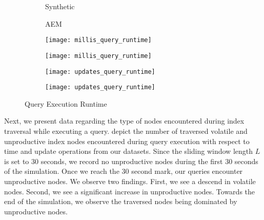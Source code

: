 \documentclass[abstracton,12pt]{scrartcl}
\theoremstyle{definition}
\begin{document}
\begin{figure}[h]
  \centering
  \begin{subfigure}{0.49\linewidth}
    \centering
    Synthetic
  \end{subfigure}
  \begin{subfigure}{0.49\linewidth}
    \centering
    AEM
  \end{subfigure}
  \begin{subfigure}{0.49\linewidth}
    \centering
    \texttt{[image: millis\_query\_runtime]}
    \caption{}
    \label{fig:query_runtime_synthetic_millis}
  \end{subfigure}
  \begin{subfigure}{0.49\linewidth}
    \centering
    \texttt{[image: millis\_query\_runtime]}
    \caption{}
    \label{fig:query_runtime_aem_millis}
  \end{subfigure}
  \begin{subfigure}{0.49\linewidth}
    \centering
    \texttt{[image: updates\_query\_runtime]}
    \caption{}
    \label{fig:query_runtime_synthetic_updates}
  \end{subfigure}
  \begin{subfigure}{0.49\linewidth}
    \centering
    \texttt{[image: updates\_query\_runtime]}
    \caption{}
    \label{fig:query_runtime_aem_updates}
  \end{subfigure}
  \caption{Query Execution Runtime}
  \label{fig:query_runtime}
\end{figure}

Next, we present data regarding the type of nodes encountered during index traversal while
executing a query.
 depict
the number of traversed volatile and unproductive index nodes encountered during query
execution with respect to time and update operations from our datasets.
Since the sliding window length $L$ is set to $30$ seconds, we record no
unproductive nodes during the first $30$ seconds of the simulation. Once we
reach the $30$ second mark, our queries encounter unproductive nodes. We observe
two findings. First, we see a descend in volatile nodes. Second, we see a
significant increase in unproductive nodes. Towards the end of the simulation,
we observe the traversed nodes being dominated by unproductive nodes. 
\end{document}
